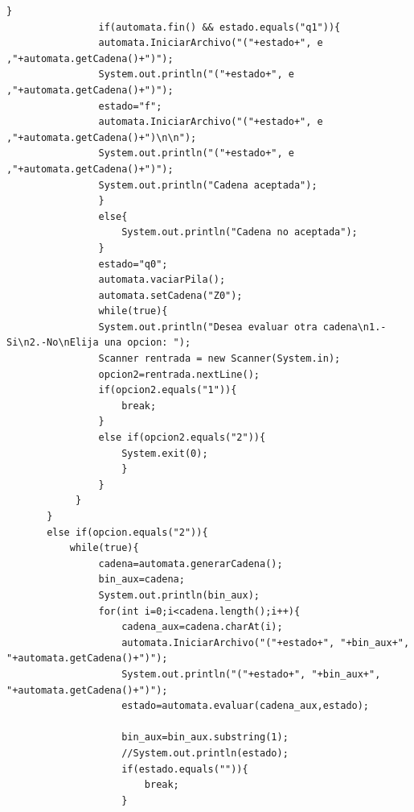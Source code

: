 \begin{lstlisting}[frame=single]
                }
                if(automata.fin() && estado.equals("q1")){
                automata.IniciarArchivo("("+estado+", e ,"+automata.getCadena()+")");
                System.out.println("("+estado+", e ,"+automata.getCadena()+")");
                estado="f";
                automata.IniciarArchivo("("+estado+", e ,"+automata.getCadena()+")\n\n");
                System.out.println("("+estado+", e ,"+automata.getCadena()+")");
                System.out.println("Cadena aceptada");
                }
                else{
                    System.out.println("Cadena no aceptada");
                }
                estado="q0";
                automata.vaciarPila();
                automata.setCadena("Z0");
                while(true){
                System.out.println("Desea evaluar otra cadena\n1.-Si\n2.-No\nElija una opcion: ");
                Scanner rentrada = new Scanner(System.in);
                opcion2=rentrada.nextLine(); 
                if(opcion2.equals("1")){
                    break;
                }
                else if(opcion2.equals("2")){
                    System.exit(0);
                    }
                }        
            }
       }         
       else if(opcion.equals("2")){
           while(true){
                cadena=automata.generarCadena();
                bin_aux=cadena;
                System.out.println(bin_aux);
                for(int i=0;i<cadena.length();i++){
                    cadena_aux=cadena.charAt(i);
                    automata.IniciarArchivo("("+estado+", "+bin_aux+", "+automata.getCadena()+")");
                    System.out.println("("+estado+", "+bin_aux+", "+automata.getCadena()+")");
                    estado=automata.evaluar(cadena_aux,estado);
                    
                    bin_aux=bin_aux.substring(1);
                    //System.out.println(estado);
                    if(estado.equals("")){
                        break;
                    }
 

\end{lstlisting}

